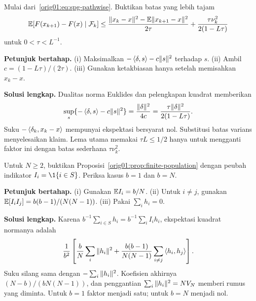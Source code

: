 \begin{exercise}
  \label{orig01:exercise:young-constant}
  Mulai dari~\eqref{orig01:eq:spg-pathwise}. Buktikan batas yang lebih tajam
  \begin{equation}
    \mathbb{E}[F(x_{k+1})-F(x)\mid\mathcal F_k]
    \leq\frac{\|x_k-x\|^2-
      \mathbb{E}\|x_{k+1}-x\|^2}{2\tau}
    +\frac{\tau\nu_k^2}{2(1-L\tau)}
  \end{equation}
  untuk $0<\tau<L^{-1}$.

  \textbf{Petunjuk bertahap.}
  (i) Maksimalkan $-\left\langle\delta , s\right\rangle-c\|s\|^2$ terhadap $s$.
  (ii) Ambil $c=(1-L\tau)/(2\tau)$.
  (iii) Gunakan ketakbiasan hanya setelah memisahkan $x_k-x$.

  \textbf{Solusi lengkap.}
  Dualitas norma Euklides dan pelengkapan kuadrat memberikan
  \begin{equation}
    \sup_s\{-\left\langle\delta , s\right\rangle-c\|s\|^2\}
    =\frac{\|\delta\|^2}{4c}
    =\frac{\tau\|\delta\|^2}{2(1-L\tau)}.
  \end{equation}
  Suku $-\left\langle\delta_k , x_k-x\right\rangle$ mempunyai ekspektasi bersyarat nol.
  Substitusi batas varians menyelesaikan klaim. Lema utama memakai
  $\tau L\leq1/2$ hanya untuk mengganti faktor ini dengan batas sederhana
  $\tau\nu_k^2$.
\end{exercise}

\begin{exercise}
  \label{orig01:exercise:finite-population}
  Untuk $N\geq2$, buktikan Proposisi~\ref{orig01:prop:finite-population} dengan peubah
  indikator $I_i=\1\{i\in S\}$. Periksa kasus $b=1$ dan $b=N$.

  \textbf{Petunjuk bertahap.}
  (i) Gunakan $\mathbb{E} I_i=b/N$.
  (ii) Untuk $i\ne j$, gunakan
  $\mathbb{E}[I_iI_j]=b(b-1)/(N(N-1))$.
  (iii) Pakai $\sum_i h_i=0$.

  \textbf{Solusi lengkap.}
  Karena $b^{-1}\sum_{i\in S}h_i=b^{-1}\sum_iI_ih_i$,
  ekspektasi kuadrat normanya adalah
  \begin{multline}
    \frac1{b^2}\left[
      \frac bN\sum_i\|h_i\|^2
      +\frac{b(b-1)}{N(N-1)}
        \sum_{i\ne j}\left\langle h_i , h_j\right\rangle
    \right].
  \end{multline}
  Suku silang sama dengan $-\sum_i\|h_i\|^2$. Koefisien akhirnya
  $(N-b)/(bN(N-1))$, dan penggantian
  $\sum_i\|h_i\|^2=NV_N$ memberi rumus yang diminta. Untuk $b=1$ faktor
  menjadi satu; untuk $b=N$ menjadi nol.
\end{exercise}


